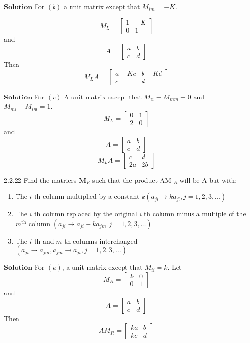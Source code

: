 $\boxed{\textbf{Solution}}$ For $(b)$ a unit matrix except that $M_{i m}=-K$.

$$M_{L}=\left[\begin{array}{cc}1 & -K \\ 0 & 1\end{array}\right]$$
and 
$$A=\left[\begin{array}{ll}a & b \\ c & d\end{array}\right]$$
Then
$$
M_{L} A=\left[\begin{array}{cc}
a-K c & b-K d \\
c & d
\end{array}\right]
$$

$\boxed{\textbf{Solution}}$  For $(c)$ A unit matrix except that $M_{i i}=M_{m m}=0$ and $M_{m i}-M_{i m}=1$.
$$M_{L}=\left[\begin{array}{ll}0 & 1 \\ 2 & 0\end{array}\right]$$ 
and 
$$A=\left[\begin{array}{ll}a & b \\ c & d\end{array}\right]$$
$$
M_{L} A=\left[\begin{array}{cc}
c & d \\
2 a & 2 b
\end{array}\right]
$$



\newpage


\begin{mybox}{2.2.22}
Find the matrices $\mathbf{M}_{R}$ such that the product AM $_{R}$ will be A but with:

\begin{enumerate}[$(a)$]
\item The $i$ th column multiplied by a constant $k\left(a_{j i} \rightarrow k a_{j i}, j=1,2,3, \ldots\right)$
\item The $i$ th column replaced by the original $i$ th column minus a multiple of the $m^{\text{th}}$ column $\left(a_{j i} \rightarrow a_{j i}-k a_{j m}, j=1,2,3, \ldots\right)$
\item The $i$ th and $m$ th columns interchanged $\left(a_{j i} \rightarrow a_{j m}, a_{j m} \rightarrow a_{j i}, j=1,2,3, \ldots\right)$
\end{enumerate}
\end{mybox}


$\boxed{\textbf{Solution}}$  For $(a)$, a unit matrix except that $M_{i i}=k$. Let 
$$M_{R}=\left[\begin{array}{ll}k & 0 \\ 0 & 1\end{array}\right]$$ 
and 
$$A=\left[\begin{array}{ll}a & b \\ c & d\end{array}\right]$$
Then 
$$A M_{R}=\left[\begin{array}{ll}k a & b \\ k c & d\end{array}\right]$$

